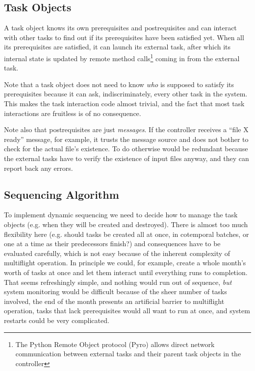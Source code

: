 \documentclass[a4paper,12pt]{amsart}
\begin{document}
\subsection{Task Objects}

A task object knows its own prerequisites and postrequisites and can
interact with other tasks to find out if its prerequisites have been
satisfied yet. When all its prerequisites are satisfied, it can launch
its external task, after which its internal state is updated by remote
method calls\footnote{The Python Remote Object protocol (Pyro) allows
direct network communication between external tasks and their parent
task objects in the controller} coming in from the external task. 

Note that a task object does not need to know {\em who} is supposed to
satisfy its prerequisites because it can ask, indiscriminately, every
other task in the system. This makes the task interaction code almost
trivial, and the fact that most task interactions are fruitless is of no
consequence. 

Note also that postrequisites are just {\em messages}. If the controller
receives a ``file X ready'' message, for example, it trusts the message
source and does not bother to check for the actual file's existence. To
do otherwise would be redundant because the external tasks have to
verify the existence of input files anyway, and they can report back any
errors.


\subsection{Sequencing Algorithm}

To implement dynamic sequencing we need to decide how to manage the task
objects (e.g. when they will be created and destroyed). There is almost
too much flexibility here (e.g.  should tasks be created all at once, in
cotemporal batches, or one at a time as their predecessors finish?) and
consequences have to be evaluated carefully, which is not easy because
of the inherent complexity of multiflight operation. In principle we
could, for example, create a whole month's worth of tasks at once and
let them interact until everything runs to completion. That seems
refreshingly simple, and nothing would run out of sequence, {\em but}
system monitoring would be difficult because of the sheer number of
tasks involved, the end of the month presents an artificial barrier to
multiflight operation, tasks that lack prerequisites would all want to
run at once, and system restarts could be very complicated. 
\end{document}
